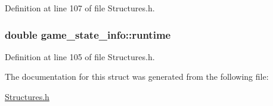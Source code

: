 Definition at line 107 of file Structures.\-h.

\hypertarget{structgame__state__info_ac601ae590859dff59da88a221761a1f2}{
\subsubsection[{runtime}]{\setlength{\rightskip}{0pt plus 5cm}double game\-\_\-state\-\_\-info\-::runtime}}\label{structgame__state__info_ac601ae590859dff59da88a221761a1f2}


Definition at line 105 of file Structures.\-h.



The documentation for this struct was generated from the following file\-:\begin{DoxyCompactItemize}
\item 
\hyperlink{Structures_8h}{Structures.\-h}\end{DoxyCompactItemize}
